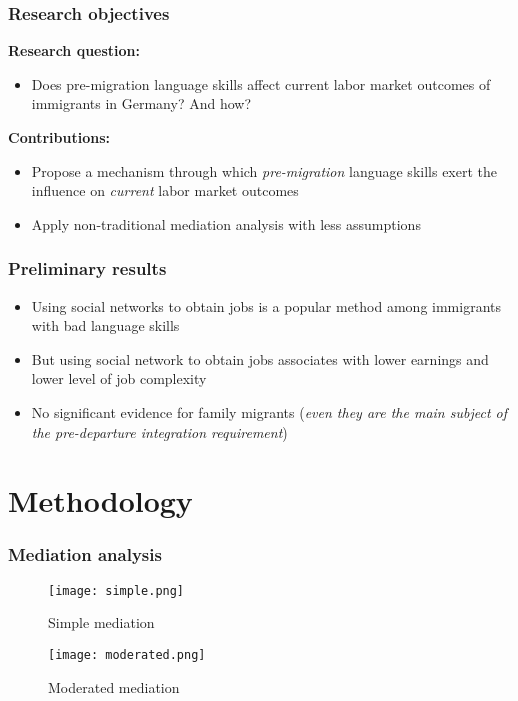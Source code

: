 \documentclass{beamer}
\begin{document}
\begin{frame}
\frametitle{Research objectives}
\textbf {Research question:}
\begin{itemize}
\item Does pre-migration language skills affect current labor market outcomes of immigrants in Germany? And how?
\end{itemize}

\textbf {Contributions:}
\begin{itemize}
\item Propose a mechanism through which \textit{pre-migration} language skills exert the influence on \textit{current} labor market outcomes
\item Apply non-traditional mediation analysis with less assumptions 
\end{itemize}
\end{frame}

\begin{frame}

\frametitle{Preliminary results}
\begin{itemize}
\item Using social networks to obtain jobs is a popular method among immigrants with bad language skills
\item But using social network to obtain jobs associates with lower earnings and lower level of job complexity
\item No significant evidence for family migrants (\textit{even they are the main subject of the pre-departure integration requirement})
\end{itemize}

\end{frame}



\section{Methodology}

\begin{frame}
\frametitle{Mediation analysis}
\begin{figure}[ht]
        \begin{minipage}[b]{0.45\linewidth}
            \centering
            \texttt{[image: simple.png]}
            \caption{Simple mediation}
            
        \end{minipage}
        \hspace{0.5cm}
        \begin{minipage}[b]{0.45\linewidth}
            \centering
            \texttt{[image: moderated.png]}
            \caption{Moderated mediation}
            
        \end{minipage}
    \end{figure}

\end{frame}
\end{document}
